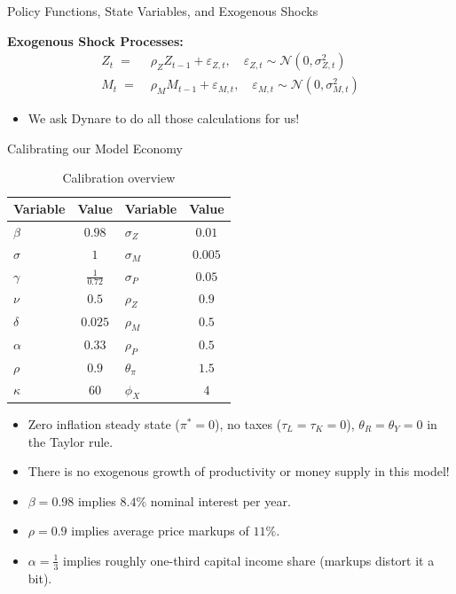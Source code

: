 \documentclass[10pt,c,aspectratio=1610,handout]{beamer}
\begin{document}
\begin{frame}{Policy Functions, State Variables, and Exogenous Shocks}
\begin{itemize}
  \end{itemize}%
  \pause%
  \textbf{Exogenous Shock Processes:}%
    \begin{align*}%
      Z_t \; = & \; \rho_Z Z_{t-1} + \varepsilon_{Z,t}, \quad \varepsilon_{Z,t} \sim \mathcal{N} \left(0,\sigma_{Z,t}^2\right)\\%
      M_t \; = & \; \rho_M M_{t-1} + \varepsilon_{M,t}, \quad \varepsilon_{M,t} \sim \mathcal{N} \left(0,\sigma_{M,t}^2\right)%
    \end{align*}%
  \pause%
  \vspace*{-0.2in}%
  \begin{itemize}%
    \item[$\Rightarrow$] We ask Dynare to do all those calculations for us!%
  \end{itemize}%
\end{frame}%
\begin{frame}{Calibrating our Model Economy}%
  \begin{table}%
    \centering%
    \footnotesize%
    \renewcommand{\arraystretch}{0.9}%
    \begin{tabular}{l c| l c}%
      \hline%
      Variable & Value & Variable & Value\\%
      \hline \hline%
      $\beta$ & $0.98$ & $\sigma_Z$ & $0.01$\\%
      $\sigma$ & $1$ & $\sigma_M$ & $0.005$\\%
      $\gamma$ & $\frac{1}{0.72}$ & $\sigma_P$ & $0.05$\\%
      $\nu$ & $0.5$ & $\rho_Z$ & $0.9$ \\%
      $\delta$ & $0.025$ & $\rho_M$ & $0.5$ \\%
      $\alpha$ & $0.33$ & $\rho_P$ & $0.5$ \\%
      $\rho$ & $0.9$ & $\theta_\pi$ & $1.5$ \\%
      $\kappa$ & $60$ & $\phi_X$ & $4$\\%
      \hline%
    \end{tabular}%
    \caption{Calibration overview}%
  \end{table}%
  \pause%
  \small%
  \begin{itemize}%
    \item[$\blacktriangleright$] Zero inflation steady state ($\pi^* = 0$), no taxes ($\tau_L = \tau_K = 0$), $\theta_R = \theta_Y = 0$ in the Taylor rule.%
    \item[$\blacktriangleright$] There is no exogenous growth of productivity or money supply in this model!%
    \pause%
    \item[$\blacktriangleright$] $\beta=0.98$ implies $8.4 \%$ nominal interest per year.%
    \item[$\blacktriangleright$] $\rho=0.9$ implies average price markups of $11 \%$.%
    \item[$\blacktriangleright$] $\alpha=\frac{1}{3}$ implies roughly one-third capital income share (markups distort it a bit).%
  \end{itemize}%
\end{frame}%
\end{document}
